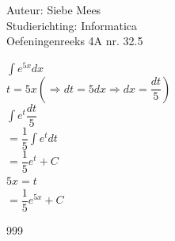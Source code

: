 \documentclass[a4paper]{article}
\begin{document}
  
\noindent \large Auteur: Siebe Mees \\
\noindent \large Studierichting: Informatica\\
\noindent \large Oefeningenreeks 4A nr. 32.5\\

\medskip

\normalsize

$\displaystyle\int e^{5x}dx$\\

$t=5x \left( \Rightarrow dt=5dx \Rightarrow dx=\dfrac{dt}{5} \right)$\\

$\displaystyle\int e^t \dfrac{dt}{5}$\\

$=\dfrac{1}{5}\displaystyle\int e^t dt$\\

$=\dfrac{1}{5}e^t + C$\\

$5x = t$\\

$=\dfrac{1}{5}e^{5x} + C$\\

\begin{thebibliography}{999}
\end{thebibliography}
\end{document}
